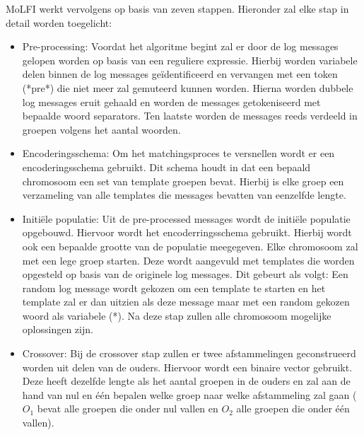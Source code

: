 MoLFI werkt vervolgens op basis van zeven stappen. Hieronder zal elke stap in detail worden toegelicht:
\begin{itemize}
    \item Pre-processing: Voordat het algoritme begint zal er door de log messages gelopen worden op basis van een reguliere expressie. Hierbij worden variabele delen binnen de log messages geïdentificeerd en vervangen met een token (*pre*) die niet meer zal gemuteerd kunnen worden. Hierna worden dubbele log messages eruit gehaald en worden de messages getokeniseerd met bepaalde woord separators. Ten laatste worden de messages reeds verdeeld in groepen volgens het aantal woorden.\\
    \item Encoderingsschema: Om het matchingsproces te versnellen wordt er een encoderingsschema gebruikt. Dit schema houdt in dat een bepaald chromosoom een set van template groepen bevat. Hierbij is elke groep een verzameling van alle templates die messages bevatten van eenzelfde lengte.\\
    \item Initiële populatie: Uit de pre-processed messages wordt de initiële populatie opgebouwd. Hiervoor wordt het encoderringsschema gebruikt. Hierbij wordt ook een bepaalde grootte van de populatie meegegeven. Elke chromosoom zal met een lege groep starten. Deze wordt aangevuld met templates die worden opgesteld op basis van de originele log messages. Dit gebeurt als volgt: Een random log message wordt gekozen om een template te starten en het template zal er dan uitzien als deze message maar met een random gekozen woord als variabele (*). Na deze stap zullen alle chromosoom mogelijke oplossingen zijn.\\
    \item Crossover: Bij de crossover stap zullen er twee afstammelingen geconstrueerd worden uit delen van de ouders. Hiervoor wordt een binaire vector gebruikt. Deze heeft dezelfde lengte als het aantal groepen in de ouders en zal aan de hand van nul en één bepalen welke groep naar welke afstammeling zal gaan ($O_{1}$ bevat alle groepen die onder nul vallen en $O_{2}$ alle groepen die onder één vallen).\\

\end{itemize}

